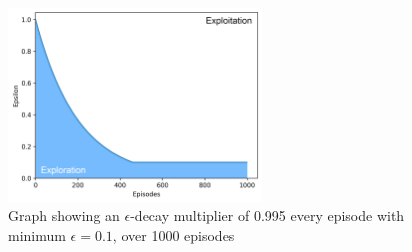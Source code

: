 \begin{figure}[H]
  \centering
  \includegraphics[width=0.6\textwidth]{figures/images/epsilon_decay.png}
  \caption[Epsilon decay graph]{Graph showing an $\epsilon$-decay multiplier of 0.995 every episode with minimum $\epsilon=0.1$, over 1000 episodes}
  \label{fig:epsilon_decay}
\end{figure}
